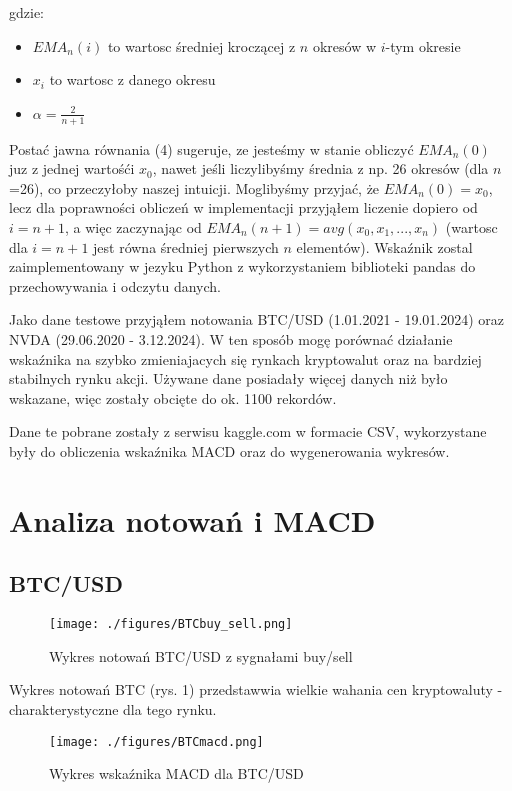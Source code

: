 \documentclass[a4paper,12pt]{article}  %
\begin{document}
gdzie:
\begin{itemize}
  \item $EMA_{n}(i)$ to wartosc średniej kroczącej z $n$ okresów w $i$-tym okresie
  \item $x_i$ to wartosc z danego okresu
  \item $\alpha = \frac{2}{n+1}$
\end{itemize}


Postać jawna równania (4) sugeruje, ze jesteśmy w stanie obliczyć 
$EMA_{n}(0)$ juz z jednej wartośći $x_0$, nawet jeśli liczylibyśmy 
średnia z np. 26 okresów (dla $n$=26), co przeczyłoby naszej intuicji.
Moglibyśmy przyjać, że $EMA_{n}(0) = x_0$, lecz dla poprawności obliczeń
w implementacji przyjąłem liczenie dopiero od $i = n+1$, a więc zaczynając od
$EMA_n(n+1) = avg(x_0, x_1, ..., x_n)$ (wartosc dla $i=n+1$ jest równa średniej pierwszych $n$
elementów).
Wskaźnik zostal zaimplementowany w jezyku Python z wykorzystaniem biblioteki
pandas do przechowywania i odczytu danych. 

Jako dane testowe przyjąłem notowania BTC/USD (1.01.2021 - 19.01.2024) oraz
NVDA (29.06.2020 - 3.12.2024). W ten sposób mogę porównać działanie wskaźnika
na szybko zmieniajacych się rynkach kryptowalut oraz na bardziej stabilnych
rynku akcji. Używane dane posiadały więcej danych niż było wskazane, więc 
zostały obcięte do ok. 1100 rekordów.

Dane te pobrane zostały z serwisu kaggle.com w formacie CSV, wykorzystane były 
do obliczenia wskaźnika MACD oraz do wygenerowania wykresów. 

\pagebreak

\section{Analiza notowań i MACD}
\subsection{BTC/USD}

\begin{figure}[H]
  \centering
  \texttt{[image: ./figures/BTCbuy\_sell.png]}
  \caption{Wykres notowań BTC/USD z sygnałami buy/sell}
\end{figure}

Wykres notowań BTC (rys. 1) przedstawwia wielkie wahania cen kryptowaluty -
charakterystyczne dla tego rynku.

\begin{figure}[H]
  \centering
  \texttt{[image: ./figures/BTCmacd.png]}
  \caption{Wykres wskaźnika MACD dla BTC/USD}
\end{figure}
\end{document}
